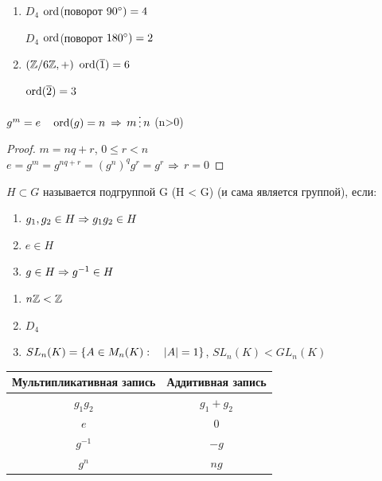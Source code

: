 \documentclass[12pt, fleqn]{article}
\begin{document}
\begin{example}
    \begin{enumerate}                               
    	\item $D_4$ $\mathop{\rm ord}\nolimits$(поворот $90\degree) =4$
    	
    	$D_4$ $\mathop{\rm ord}\nolimits$(поворот $180\degree) =2$
    	\item $(\mathbb{Z} /6 \mathbb{Z}, +)$ $\mathop{\rm ord}\nolimits(\overline{1})=6$
    	
    	$\mathop{\rm ord}\nolimits(\overline{2})=3$
	\end{enumerate} 
\end{example}

\begin{utv}
    $g^m=e \quad \mathop{\rm ord}\nolimits(g)=n$ $\Rightarrow$ $m \devides n$ (n>0)
\end{utv}
\begin{proof}
    $m=n q+r$, $0 \leqslant r < n$
    \\
    $e=g^m=g^{n q + r}=(g^n)^q g^r=g^r$ $\Rightarrow$ $r=0$
\end{proof}

\begin{definition}
    $H \subset G$ называется подгруппой G (H < G) (и сама является группой), если:
    \begin{enumerate}                               
    	\item $g_1,g_2 \in H \Rightarrow g_1 g_2 \in H$
    	\item $e \in H$
    	\item $g \in H \Rightarrow g^{-1} \in H$
	\end{enumerate} 
\end{definition}

\begin{example}
    \begin{enumerate}                               
    	\item $n\mathbb{Z} < \mathbb{Z}$
    	\item $D_4$
    	\item $SL_n(K)=\{A \in M_n(K): \quad |A|=1\}$, $SL_n(K)<GL_n(K)$
	\end{enumerate} 
\end{example}

\begin{tabular} {c|c}
	Мультипликативная запись & Аддитивная запись\\ \hline 
	$g_1 g_2$ & $g_1 + g_2$\\
	$e$ & $0$\\
	$g^{-1}$ & $-g$\\
    $g^n$ & $n g$ 
\end{tabular}
\end{document}
